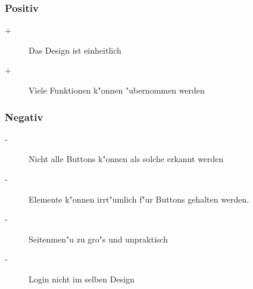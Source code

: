 \subsubsection{Positiv}\begin{description}
\item[+] Das Design ist einheitlich 
\item[+] Viele Funktionen k"onnen "ubernommen werden
\end{description}

\subsubsection{Negativ}\begin{description}
\item[-] Nicht alle Buttons k"onnen als solche erkannt werden
\item[-] Elemente k"onnen irrt"umlich f"ur Buttons gehalten werden.
\item[-] Seitenmen"u zu gro"s und unpraktisch 
\item[-] Login nicht im selben Design
\end{description}

